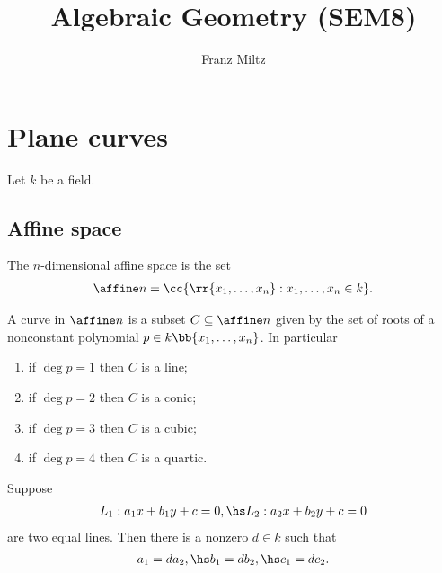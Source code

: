 \documentclass{article}
\begin{document}
\mkthmstwounified
\title{Algebraic Geometry (SEM8)}
\author{Franz Miltz}
\maketitle
\tableofcontents
\pagebreak

\section{Plane curves}

Let $k$ be a field.

\subsection{Affine space}\label{sec:affine_space}

\begin{definition}
  The $n$-dimensional affine space is the set
  \begin{align*}
    \affine n = \cc{\rr{x_1,\ldots,x_n}:x_1,\ldots,x_n\in k}.
  \end{align*}
\end{definition}

\begin{definition}
  A curve in $\affine n$ is a subset $C\subseteq \affine n$ given by the
  set of roots of a nonconstant polynomial $p\in k\bb{x_1,\ldots,x_n}$.
  In particular
  \begin{enumerate}
    \item if $\deg p = 1$ then $C$ is a line;
    \item if $\deg p = 2$ then $C$ is a conic;
    \item if $\deg p = 3$ then $C$ is a cubic;
    \item if $\deg p = 4$ then $C$ is a quartic.
  \end{enumerate}
\end{definition}

\begin{proposition}
  Suppose
  \begin{align*}
    L_1 : a_1 x + b_1 y + c = 0, \hs
    L_2 : a_2 x + b_2 y + c = 0
  \end{align*}
  are two equal lines. Then there is a nonzero $d\in k$ such that
  \begin{align*}
    a_1 = d a_2, \hs b_1 = d b_2, \hs c_1 = d c_2.
  \end{align*}
\end{proposition}
\end{document}

